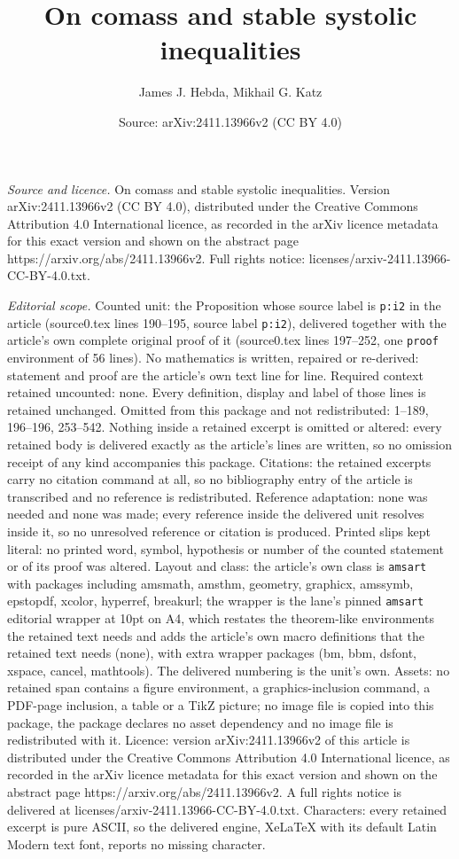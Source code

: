 \documentclass[10pt,a4paper]{amsart}
\title[On comass and stable systolic inequalities]{On comass and stable systolic inequalities}
\author{James J. Hebda, Mikhail G. Katz}
\date{Source: arXiv:2411.13966v2 (CC BY 4.0)}
\begin{document}
\maketitle

\noindent\emph{Source and licence.} On comass and stable systolic inequalities. Version arXiv:2411.13966v2 (CC BY 4.0), distributed under the Creative Commons Attribution 4.0 International licence, as recorded in the arXiv licence metadata for this exact version and shown on the abstract page https://arxiv.org/abs/2411.13966v2. Full rights notice: licenses/arxiv-2411.13966-CC-BY-4.0.txt.\par\smallskip

\noindent\textit{Editorial scope.} Counted unit: the Proposition whose source label is \texttt{p:i2} in the article (source0.tex lines 190--195, source label \texttt{p:i2}), delivered together with the article's own complete original proof of it (source0.tex lines 197--252, one \texttt{proof} environment of 56 lines). No mathematics is written, repaired or re-derived: statement and proof are the article's own text line for line. Required context retained uncounted: none. Every definition, display and label of those lines is retained unchanged. Omitted from this package and not redistributed: 1--189, 196--196, 253--542. Nothing inside a retained excerpt is omitted or altered: every retained body is delivered exactly as the article's lines are written, so no omission receipt of any kind accompanies this package. Citations: the retained excerpts carry no citation command at all, so no bibliography entry of the article is transcribed and no reference is redistributed. Reference adaptation: none was needed and none was made; every reference inside the delivered unit resolves inside it, so no unresolved reference or citation is produced. Printed slips kept literal: no printed word, symbol, hypothesis or number of the counted statement or of its proof was altered. Layout and class: the article's own class is \texttt{amsart} with packages including amsmath, amsthm, geometry, graphicx, amssymb, epstopdf, xcolor, hyperref, breakurl; the wrapper is the lane's pinned \texttt{amsart} editorial wrapper at 10pt on A4, which restates the theorem-like environments the retained text needs and adds the article's own macro definitions that the retained text needs (none), with extra wrapper packages (bm, bbm, dsfont, xspace, cancel, mathtools). The delivered numbering is the unit's own. Assets: no retained span contains a figure environment, a graphics-inclusion command, a PDF-page inclusion, a table or a TikZ picture; no image file is copied into this package, the package declares no asset dependency and no image file is redistributed with it. Licence: version arXiv:2411.13966v2 of this article is distributed under the Creative Commons Attribution 4.0 International licence, as recorded in the arXiv licence metadata for this exact version and shown on the abstract page https://arxiv.org/abs/2411.13966v2. A full rights notice is delivered at licenses/arxiv-2411.13966-CC-BY-4.0.txt. Characters: every retained excerpt is pure ASCII, so the delivered engine, XeLaTeX with its default Latin Modern text font, reports no missing character.
\end{document}
